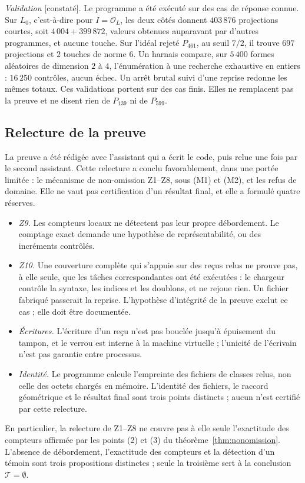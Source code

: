 \documentclass[11pt,a4paper]{amsart}
\theoremstyle{plain}
\theoremstyle{definition}
\numberwithin{equation}{section}
\newcommand{\OO}{\mathcal{O}}
\newcommand{\Tc}{\mathcal{T}}
\newcommand{\Lz}{L_{0}}
\newcommand{\st}[1]{\textup{\textsf{\small[#1]}}}
\newcommand{\CONS}{\st{constaté}}
\begin{document}
\emph{Validation} \CONS. Le programme a été exécuté sur des cas de réponse connue. Sur $\Lz$, c'est-à-dire pour $I=\OO_L$, les deux côtés donnent $403\,876$ projections courtes, soit $4\,004+399\,872$, valeurs obtenues auparavant par d'autres programmes, et aucune touche. Sur l'idéal rejeté $P_{461}$, au seuil $7/2$, il trouve $697$ projections et $2$ touches de norme $6$. Un harnais compare, sur $5\,400$ formes aléatoires de dimension $2$ à $4$, l'énumération à une recherche exhaustive en entiers : $16\,250$ contrôles, aucun échec. Un arrêt brutal suivi d'une reprise redonne les mêmes totaux. Ces validations portent sur des cas finis. Elles ne remplacent pas la preuve et ne disent rien de $P_{139}$ ni de $P_{599}$.

\subsection{Relecture de la preuve}
La preuve a été rédigée avec l'assistant qui a écrit le code, puis relue une fois par le second assistant. Cette relecture a conclu favorablement, dans une portée limitée : le mécanisme de non-omission Z1--Z8, sous (M1) et (M2), et les refus de domaine. Elle ne vaut pas certification d'un résultat final, et elle a formulé quatre réserves.
\begin{itemize}
\item \emph{Z9.} Les compteurs locaux ne détectent pas leur propre débordement. Le comptage exact demande une hypothèse de représentabilité, ou des incréments contrôlés.
\item \emph{Z10.} Une couverture complète qui s'appuie sur des reçus relus ne prouve pas, à elle seule, que les tâches correspondantes ont été exécutées : le chargeur contrôle la syntaxe, les indices et les doublons, et ne rejoue rien. Un fichier fabriqué passerait la reprise. L'hypothèse d'intégrité de la preuve exclut ce cas ; elle doit être documentée.
\item \emph{Écritures.} L'écriture d'un reçu n'est pas bouclée jusqu'à épuisement du tampon, et le verrou est interne à la machine virtuelle ; l'unicité de l'écrivain n'est pas garantie entre processus.
\item \emph{Identité.} Le programme calcule l'empreinte des fichiers de classes relus, non celle des octets chargés en mémoire. L'identité des fichiers, le raccord géométrique et le résultat final sont trois points distincts ; aucun n'est certifié par cette relecture.
\end{itemize}
En particulier, la relecture de Z1--Z8 ne couvre pas à elle seule l'exactitude des compteurs affirmée par les points (2) et (3) du théorème~\ref{thm:nonomission}. L'absence de débordement, l'exactitude des compteurs et la détection d'un témoin sont trois propositions distinctes ; seule la troisième sert à la conclusion $\Tc=\emptyset$.
\end{document}
